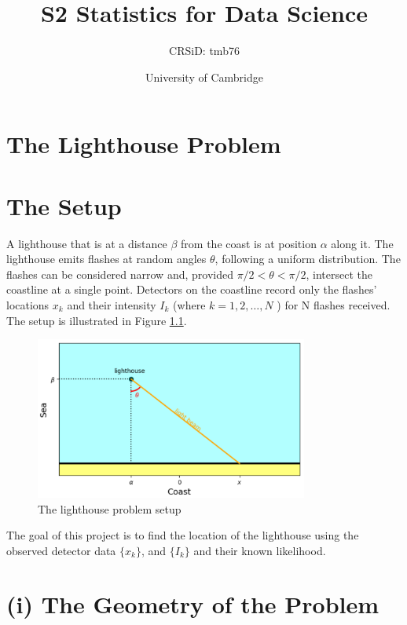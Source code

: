 \documentclass[12pt]{report} %
\title{S2 Statistics for Data Science}
\author{CRSiD: tmb76}
\date{University of Cambridge}
\begin{document}
\maketitle

\tableofcontents

\chapter*{The Lighthouse Problem}

\chapter{The Setup}

\indent A lighthouse that is at a distance $\beta$ from the coast is at position $\alpha$ along it. The lighthouse emits flashes at random angles $\theta$, following a uniform distribution. The flashes can be considered narrow and, provided $\pi/2 < \theta < \pi/2$, intersect the coastline at a single point. Detectors on the coastline record only the flashes' locations $x_{k}$ and their intensity $I_{k}$ (where $k = 1, 2,\dots, N$ ) for N flashes received. The setup is illustrated in Figure \ref{fig:lighthouse}.

\begin{figure}[h]
\centering
\includegraphics[width=0.8\textwidth]{../Plots/lighthouse diagram.png}
\caption{The lighthouse problem setup}
\label{fig:lighthouse}
\end{figure}


The goal of this project is to find the location of the lighthouse using the observed detector data $\{x_{k}\}$, and $\{I_{k}\}$ and their known likelihood.

\chapter{(i) The Geometry of the Problem}
\end{document}
